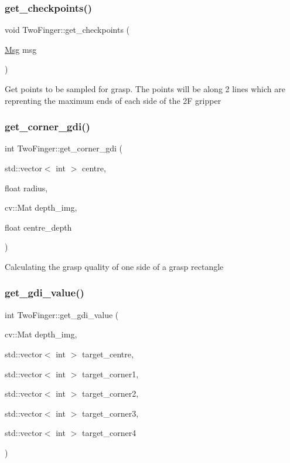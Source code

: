 \subsubsection{\texorpdfstring{get\+\_\+checkpoints()}{get\_checkpoints()}}
{\footnotesize\ttfamily void Two\+Finger\+::get\+\_\+checkpoints (\begin{DoxyParamCaption}\item[{\hyperlink{classMsg}{Msg}}]{msg }\end{DoxyParamCaption})\hspace{0.3cm}{\ttfamily [inline]}}

Get points to be sampled for grasp. The points will be along 2 lines which are reprenting the maximum ends of each side of the 2F gripper \mbox{\label{classTwoFinger_a364371baead95faf819ba910fa60e9fd}} 
\subsubsection{\texorpdfstring{get\+\_\+corner\+\_\+gdi()}{get\_corner\_gdi()}}
{\footnotesize\ttfamily int Two\+Finger\+::get\+\_\+corner\+\_\+gdi (\begin{DoxyParamCaption}\item[{std\+::vector$<$ int $>$}]{centre,  }\item[{float}]{radius,  }\item[{cv\+::\+Mat}]{depth\+\_\+img,  }\item[{float}]{centre\+\_\+depth }\end{DoxyParamCaption})\hspace{0.3cm}{\ttfamily [inline]}}

Calculating the grasp quality of one side of a grasp rectangle \mbox{\label{classTwoFinger_a9f629646c344238a7b45c68a8f92e179}} 
\subsubsection{\texorpdfstring{get\+\_\+gdi\+\_\+value()}{get\_gdi\_value()}}
{\footnotesize\ttfamily int Two\+Finger\+::get\+\_\+gdi\+\_\+value (\begin{DoxyParamCaption}\item[{cv\+::\+Mat}]{depth\+\_\+img,  }\item[{std\+::vector$<$ int $>$}]{target\+\_\+centre,  }\item[{std\+::vector$<$ int $>$}]{target\+\_\+corner1,  }\item[{std\+::vector$<$ int $>$}]{target\+\_\+corner2,  }\item[{std\+::vector$<$ int $>$}]{target\+\_\+corner3,  }\item[{std\+::vector$<$ int $>$}]{target\+\_\+corner4 }\end{DoxyParamCaption})\hspace{0.3cm}{\ttfamily [inline]}}

